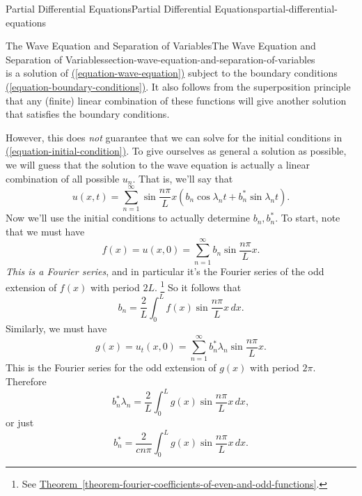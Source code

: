\documentclass[oneside,10pt,]{book}
\numberwithin{equation}{section}
\begin{document}
\begin{chapterptx}{Partial Differential Equations}{}{Partial Differential Equations}{}{}{partial-differential-equations}
\begin{sectionptx}{The Wave Equation and Separation of Variables}{}{The Wave Equation and Separation of Variables}{}{}{section-wave-equation-and-separation-of-variables}
\begin{equation*}
\end{equation*}
is a solution of \hyperref[equation-wave-equation]{(\ref{equation-wave-equation})} subject to the boundary conditions \hyperref[equation-boundary-conditions]{(\ref{equation-boundary-conditions})}. It also follows from the superposition principle that any (finite) linear combination of these functions will give another solution that satisfies the boundary conditions.%
\par
\hypertarget{p-661}{}%
However, this does \emph{not} guarantee that we can solve for the initial conditions in \hyperref[equation-initial-condition]{(\ref{equation-initial-condition})}. To give ourselves as general a solution as possible, we will guess that the solution to the wave equation is actually a linear combination of all possible \(u_{n}\). That is, we'll say that%
%
\begin{equation*}
u(x,t) = \sum_{n=1}^{\infty}\sin\frac{n\pi}{L}x\left(b_{n}\cos\lambda_{n}t+b^{*}_{n}\sin\lambda_{n}t\right).
\end{equation*}
\hypertarget{p-662}{}%
Now we'll use the initial conditions to actually determine \(b_{n},b^{*}_{n}\). To start, note that we must have%
\begin{equation*}
f(x) = u(x,0) = \sum_{n=1}^{\infty}b_{n}\sin\frac{n\pi}{L}x.
\end{equation*}
\emph{This is a Fourier series}, and in particular it's the Fourier series of the odd extension of \(f(x)\) with period \(2L\). \footnote{See \hyperref[theorem-fourier-coefficients-of-even-and-odd-functions]{Theorem~\ref{theorem-fourier-coefficients-of-even-and-odd-functions}}.\label{fn-8}} So it follows that%
%
\begin{equation*}
b_{n} = \frac{2}{L}\int_{0}^{L}f(x)\sin\frac{n\pi}{L}x\,dx.
\end{equation*}
\hypertarget{p-663}{}%
Similarly, we must have%
\begin{equation*}
g(x) = u_{t}(x,0) = \sum_{n=1}^{\infty}b_{n}^{*}\lambda_{n}\sin\frac{n\pi}{L}x.
\end{equation*}
This is the Fourier series for the odd extension of \(g(x)\) with period \(2\pi\). Therefore%
\begin{equation*}
b^{*}_{n}\lambda_{n} = \frac{2}{L}\int_{0}^{L}g(x)\sin\frac{n\pi}{L}x\,dx,
\end{equation*}
or just%
\begin{equation*}
b^{*}_{n} = \frac{2}{cn\pi}\int_{0}^{L}g(x)\sin\frac{n\pi}{L}x\,dx.
\end{equation*}
%
\par

\end{sectionptx}
\end{chapterptx}
\end{document}
